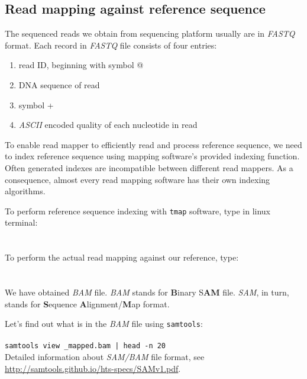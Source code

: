 \subsection{Read mapping against reference sequence}
The sequenced reads we obtain from sequencing platform usually are in \textit{FASTQ} format.
Each record in \textit{FASTQ} file consists of four entries:
\begin{enumerate}
  \item read ID, beginning with symbol @
  \item DNA sequence of read
  \item symbol +
  \item \textit{ASCII} encoded quality of each nucleotide in read
\end{enumerate}

To enable read mapper to efficiently read and process reference sequence, we need to
index reference sequence using mapping software's provided indexing function. Often generated
indexes are incompatible between different read mappers. As a consequence, almost every read
mapping software has their own indexing algorithms.

To perform reference sequence indexing with \texttt{tmap} software, type in linux terminal:\\~\\
\texttt{}\\

To perform the actual read mapping against our reference, type:\\~\\
\\

We have obtained \textit{BAM} file. \textit{BAM} stands for \textbf{B}inary S\textbf{AM} file.
\textit{SAM}, in turn, stands for \textbf{S}equence \textbf{A}lignment/\textbf{M}ap format.


Let's find out what is in the \textit{BAM} file using \texttt{samtools}:\\~\\
\texttt{samtools view \mapReads\_mapped.bam | head -n 20}\\

Detailed information about \textit{SAM/BAM} file format, see \url{http://samtools.github.io/hts-specs/SAMv1.pdf}.\\~\\
\\


